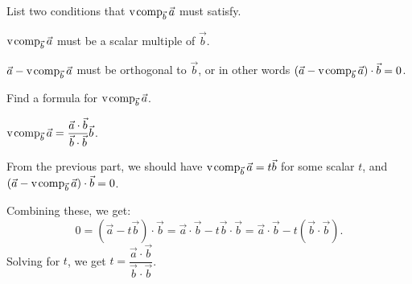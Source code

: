 \documentclass{problemset}
\begin{document}
	\begin{parts}
		\item List two conditions that $\operatorname{\operatorname{v\hspace{1pt}comp}}_{\vec b}\vec a$ must satisfy.
			\begin{solution}
				$\operatorname{\operatorname{v\hspace{1pt}comp}}_{\vec b} \vec a$ must be a scalar multiple of $\vec b$.

				$\vec a - \operatorname{\operatorname{v\hspace{1pt}comp}}_{\vec b} \vec a$ must be orthogonal to $\vec b$,
				or in other words $(\vec a-\operatorname{\operatorname{v\hspace{1pt}comp}}_{\vec b}\vec a)\cdot \vec b=0$.
			\end{solution}
		\item Find a formula for $\operatorname{\operatorname{v\hspace{1pt}comp}}_{\vec b}\vec a$.
			\begin{solution}
				$\operatorname{\operatorname{v\hspace{1pt}comp}}_{\vec b}\vec a = \dfrac{\vec a\cdot\vec b}{\vec b\cdot\vec b} \vec b$.

				From the previous part, we should have $\operatorname{\operatorname{v\hspace{1pt}comp}}_{\vec b}\vec a=t\vec b$
				for some scalar $t$, and $(\vec a-\operatorname{\operatorname{v\hspace{1pt}comp}}_{\vec b}\vec a)\cdot \vec b=0$.

				Combining these, we get:
				\[
					0=(\vec a-t \vec b)\cdot \vec b
					=\vec a\cdot\vec b - t\vec b\cdot\vec b
					=\vec a\cdot\vec b - t(\vec b\cdot\vec b).
				\]
				Solving for $t$, we get $t = \dfrac{\vec a\cdot\vec b}{\vec b\cdot\vec b}$.
			\end{solution}
	\end{parts}
\end{document}
